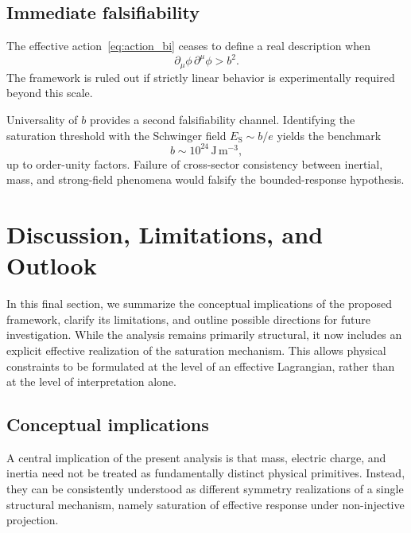 \documentclass[pdflatex,sn-mathphys-num]{sn-jnl} %
\theoremstyle{remark}
\begin{document}
  \subsection{Immediate falsifiability}
  \label{subsec:falsifiability_bound}

  The effective action~\eqref{eq:action_bi} ceases to define a real description when
  \begin{equation}
    \partial_{\mu}\phi\,\partial^{\mu}\phi > b^2.
    \label{eq:bound_violation}
  \end{equation}
  The framework is ruled out if strictly linear behavior is experimentally required beyond
  this scale.

  Universality of $b$ provides a second falsifiability channel.
  Identifying the saturation threshold with the Schwinger field
  $E_{\mathrm{S}}\sim b/e$ yields the benchmark
  \begin{equation}
    b \sim 10^{24}\,\mathrm{J\,m^{-3}},
  \end{equation}
  up to order-unity factors.
  Failure of cross-sector consistency between inertial, mass, and strong-field phenomena
  would falsify the bounded-response hypothesis.

  \section{Discussion, Limitations, and Outlook}
  \label{sec:discussion}

  In this final section, we summarize the conceptual implications of the proposed
  framework, clarify its limitations, and outline possible directions for future
  investigation.
  While the analysis remains primarily structural, it now includes an explicit
  effective realization of the saturation mechanism.
  This allows physical constraints to be formulated at the level of an effective
  Lagrangian, rather than at the level of interpretation alone.

  \subsection{Conceptual implications}
    \label{subsec:implications}

    A central implication of the present analysis is that mass, electric charge, and
    inertia need not be treated as fundamentally distinct physical primitives.
    Instead, they can be consistently understood as different symmetry realizations
    of a single structural mechanism, namely saturation of effective response under
    non-injective projection.
\end{document}
